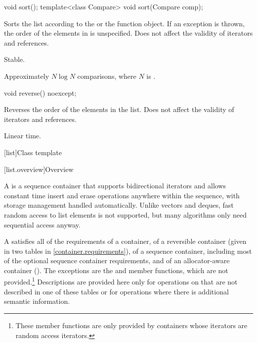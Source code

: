 %
\begin{itemdecl}
void sort();
template<class Compare> void sort(Compare comp);
\end{itemdecl}

\begin{itemdescr}
\pnum
\effects Sorts the list according to the  or the  function object.
If an exception is thrown, the order of the elements in  is unspecified.
Does not affect the validity of iterators and references.

\pnum
\remarks Stable.

\pnum
\complexity Approximately $N \log N$ comparisons, where $N$ is .
\end{itemdescr}

%
\begin{itemdecl}
void reverse() noexcept;
\end{itemdecl}

\begin{itemdescr}
\pnum
\effects Reverses the order of the elements in the list.
Does not affect the validity of iterators and references.

\pnum
\complexity Linear time.
\end{itemdescr}

[list]{Class template }

[list.overview]{Overview}

\pnum
{}%
A
is a sequence container that supports
bidirectional iterators and allows constant time insert and erase
operations anywhere within the sequence, with storage management handled
automatically. Unlike vectors and deques,
fast random access to list elements is not supported, but many
algorithms only need sequential access anyway.

\pnum
A  satisfies all of the requirements of a container, of
a reversible container (given in two tables in
\ref{container.requirements}), of a sequence container,
including most of the optional sequence container
requirements, and of an allocator-aware container
().
The exceptions are the
and
member functions, which are not provided.\footnote{These member functions
are only provided by containers whose iterators
are random access iterators.
}
Descriptions are provided here only for operations on
that are not described in one of these tables
or for operations where there is additional semantic information.

